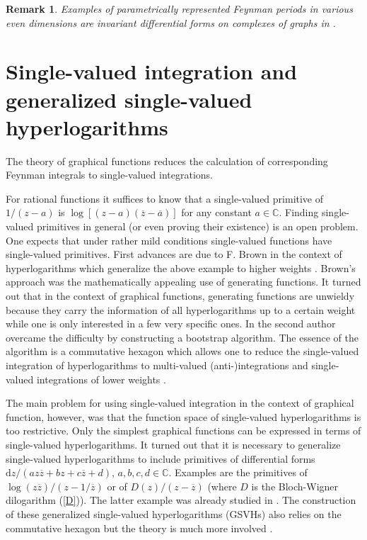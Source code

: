 \documentclass[oneside]{amsart}
\newcommand{\CC}{{\mathbb C}}
\newcommand{\dd}{\mathrm{d}}
\newcommand{\aaa}{{\overline{a}}}
\newcommand{\zz}{{\overline{z}}}
\theoremstyle{plain}
\newtheorem{remark}[thm]{Remark}
\begin{document}
\begin{remark}
Examples of parametrically represented Feynman periods in various even dimensions are invariant differential forms on complexes of graphs in \cite{Bidf}.
\end{remark}

\section{Single-valued integration and generalized single-valued hyperlogarithms}\label{sectint}
The theory of graphical functions reduces the calculation of corresponding Feynman integrals to single-valued integrations.

For rational functions it suffices to know that a single-valued primitive of $1/(z-a)$ is $\log[(z-a)(\zz-\aaa)]$ for any constant $a\in\CC$.
Finding single-valued primitives in general (or even proving their existence) is an open problem. One expects that under rather mild conditions single-valued functions have
single-valued primitives. First advances are due to F. Brown in the context of hyperlogarithms which generalize the above example to higher weights \cite{BrSVMP,BrSVMPII}.
Brown's approach was the mathematically appealing use of generating functions. It turned out that in the context of graphical functions, generating functions are
unwieldy because they carry the information of all hyperlogarithms up to a certain weight while one is only interested in a few very specific ones.
In \cite{gf} the second author overcame the difficulty by constructing a bootstrap algorithm. The essence of the algorithm is a commutative hexagon which allows one to
reduce the single-valued integration of hyperlogarithms to multi-valued (anti-)integrations and single-valued integrations of lower weights \cite{numfunct}.

The main problem for using single-valued integration in the context of graphical function, however, was that the function space of single-valued hyperlogarithms is too restrictive.
Only the simplest graphical functions can be expressed in terms of single-valued hyperlogarithms.
It turned out that it is necessary to generalize single-valued hyperlogarithms to include primitives of differential forms $\dd z/(az\zz+bz+c\zz+d)$, $a,b,c,d\in\CC$.
Examples are the primitives of $\log(z\zz)/(z-1/\zz)$ or of $D(z)/(z-\zz)$ (where $D$ is the Bloch-Wigner dilogarithm (\ref{D})). The latter example was already studied
in \cite{Duhr}. The construction of these generalized single-valued hyperlogarithms (GSVHs) also relies on the commutative hexagon but the theory is much more involved \cite{GSVH}.
\end{document}

